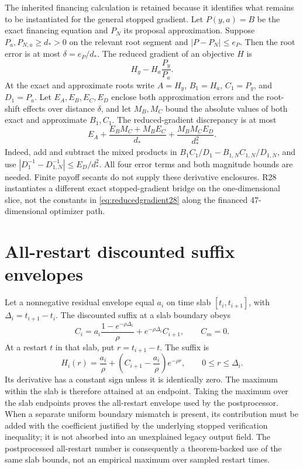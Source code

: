 The inherited financing calculation is retained because it identifies what remains to be instantiated for the general stopped gradient. Let $P(y,a)=B$ be the exact financing equation and $P_N$ its proposal approximation. Suppose $P_a,P_{N,a}\ge d_*>0$ on the relevant root segment and $|P-P_N|\le e_P$. Then the root error is at most $\delta=e_P/d_*$. The reduced gradient of an objective $H$ is
\begin{equation}
 H_y-H_a\frac{P_y}{P_a}.
\end{equation}
At the exact and approximate roots write $A=H_y$, $B_1=H_a$, $C_1=P_y$, and $D_1=P_a$. Let $E_A,E_B,E_C,E_D$ enclose both approximation errors and the root-shift effects over distance $\delta$, and let $M_B,M_C$ bound the absolute values of both exact and approximate $B_1,C_1$. The reduced-gradient discrepancy is at most
\begin{equation}\label{eq:reducedgradient28}
 E_A+\frac{E_BM_C+M_BE_C}{d_*}+\frac{M_BM_CE_D}{d_*^2}.
\end{equation}
Indeed, add and subtract the mixed products in $B_1C_1/D_1-B_{1,N}C_{1,N}/D_{1,N}$, and use $|D_1^{-1}-D_{1,N}^{-1}|\le E_D/d_*^2$. All four error terms and both magnitude bounds are needed. Finite payoff secants do not supply these derivative enclosures. R28 instantiates a different exact stopped-gradient bridge on the one-dimensional slice, not the constants in \eqref{eq:reducedgradient28} along the financed 47-dimensional optimizer path.

\section{All-restart discounted suffix envelopes}\label{app:suffix28}
Let a nonnegative residual envelope equal $a_i$ on time slab $[t_i,t_{i+1}]$, with $\Delta_i=t_{i+1}-t_i$. The discounted suffix at a slab boundary obeys
\begin{equation}
 C_i=a_i\frac{1-e^{-\rho\Delta_i}}\rho+e^{-\rho\Delta_i}C_{i+1},\qquad C_m=0.
\end{equation}
At a restart $t$ in that slab, put $r=t_{i+1}-t$. The suffix is
\begin{equation}
 H_i(r)=\frac{a_i}\rho+\left(C_{i+1}-\frac{a_i}\rho\right)e^{-\rho r},\qquad 0\le r\le\Delta_i.
\end{equation}
Its derivative has a constant sign unless it is identically zero. The maximum within the slab is therefore attained at an endpoint. Taking the maximum over the slab endpoints proves the all-restart envelope used by the postprocessor. When a separate uniform boundary mismatch is present, its contribution must be added with the coefficient justified by the underlying stopped verification inequality; it is not absorbed into an unexplained legacy output field. The postprocessed all-restart number is consequently a theorem-backed use of the same slab bounds, not an empirical maximum over sampled restart times.
